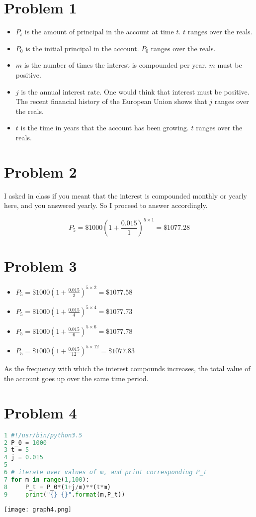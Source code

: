 \documentclass[12pt]{article}
\begin{document}
\section*{Problem 1}
\begin{itemize}
	\item $P_t$ is the amount of principal in the account at time $t$. $t$ ranges over the reals.
	\item $P_0$ is the initial principal in the account. $P_0$ ranges over the reals.
	\item $m$ is the number of times the interest is compounded per year. $m$ must be positive.
	\item $j$ is the annual interest rate. One would think that interest must be positive. The recent financial history of the European Union shows that $j$ ranges over the reals.
	\item $t$ is the time in years that the account has been growing. $t$ ranges over the reals.
\end{itemize}

\section*{Problem 2}
I asked in class if you meant that the interest is compounded monthly or yearly here, and you answered yearly. So I proceed to answer accordingly.

$$P_5 = \$1000(1+\frac{0.015}{1})^{5\times 1} = \$1077.28$$

\section*{Problem 3}
\begin{itemize}
	\item $P_5 = \$1000(1+\frac{0.015}{2})^{5\times 2} = \$1077.58$
	\item $P_5 = \$1000(1+\frac{0.015}{4})^{5\times 4} = \$1077.73$
	\item $P_5 = \$1000(1+\frac{0.015}{6})^{5\times 6} = \$1077.78$
	\item $P_5 = \$1000(1+\frac{0.015}{12})^{5\times 12} = \$1077.83$
\end{itemize}

As the frequency with which the interest compounds increases, the total value of the account goes up over the same time period.

\section*{Problem 4}


\begin{lstlisting}[language=python, caption=$P_t$ at different values of $m$]
1 #!/usr/bin/python3.5
2 P_0 = 1000
3 t = 5
4 j = 0.015
5 
6 # iterate over values of m, and print corresponding P_t
7 for m in range(1,100):
8     P_t = P_0*(1+j/m)**(t*m)
9     print("{} {}".format(m,P_t))
\end{lstlisting}

\texttt{[image: graph4.png]}
\end{document}
